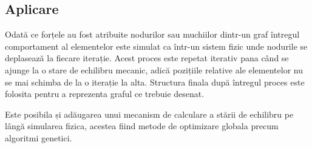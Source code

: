\subsection{Aplicare}

Odată ce forțele au fost atribuite nodurilor sau muchiilor dintr-un graf întregul comportament al elementelor 
este simulat ca într-un sistem fizic unde nodurile se deplasează la fiecare iterație. Acest proces este repetat 
iterativ pana când se ajunge la o stare de echilibru mecanic, adică pozițiile relative ale elementelor nu se mai 
schimba de la o iterație la alta. Structura finala după întregul proces este folosita pentru a reprezenta graful ce 
trebuie desenat.\newline

Este posibila și adăugarea unui mecanism de calculare a stării de echilibru pe lângă simularea fizica, acestea fiind 
metode de optimizare globala precum algoritmi genetici.\newline


